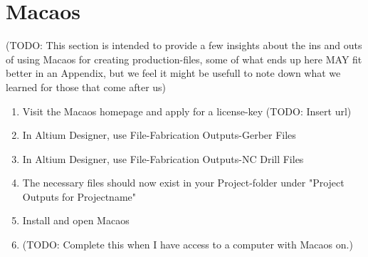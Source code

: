 \section {Macaos}

(TODO: This section is intended to provide a few insights about the
ins and outs of using Macaos for creating production-files, some of
what ends up here MAY fit better in an Appendix, but we feel it might
be usefull to note down what we learned for those that come after us)

\begin {enumerate}
\item Visit the Macaos homepage and apply for a license-key (TODO: Insert url)
\item In Altium Designer, use File-Fabrication Outputs-Gerber Files
\item In Altium Designer, use File-Fabrication Outputs-NC Drill Files
\item The necessary files should now exist in your Project-folder under "Project Outputs for Projectname"
\item Install and open Macaos
\item (TODO: Complete this when I have access to a computer with Macaos on.)
\end {enumerate}

